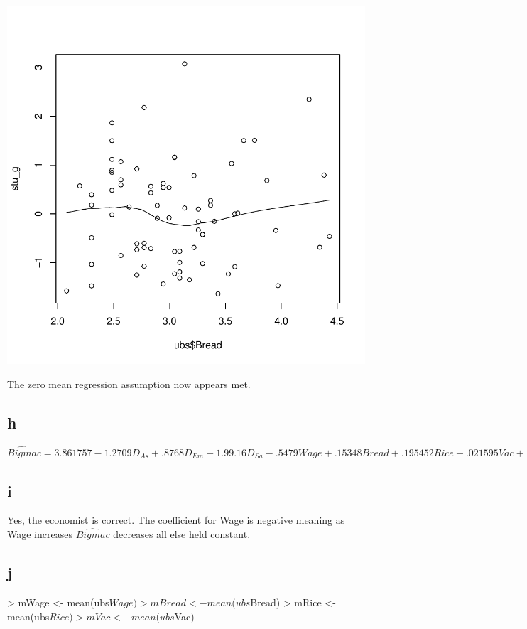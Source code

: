 \documentclass{article}
\begin{document}
\includegraphics{RegressionFinal-013}

The zero mean regression assumption now appears met. 

\subsection*{h}
$\hat{Bigmac}=3.861757-1.2709D_{As}+.8768D_{Em}-1.99.16D_{Sa}-.5479Wage+.15348Bread+.195452Rice+.021595Vac+.515727DasBread-.406481DasRice+.056577DasVac-.043681DemVac+.641239DsaBread$

\subsection*{i}
Yes, the economist is correct. The coefficient for Wage is negative meaning as Wage increases $\hat{Bigmac}$ decreases all else held constant. 

\subsection*{j}
\begin{Schunk}
\begin{Sinput}
> mWage <- mean(ubs$Wage)
> mBread <- mean(ubs$Bread)
> mRice <- mean(ubs$Rice)
> mVac <- mean(ubs$Vac)
\end{Sinput}
\end{Schunk}
\end{document}
